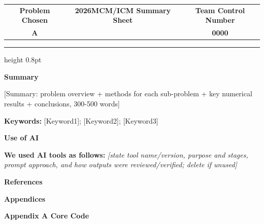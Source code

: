\documentclass[a4paper,12pt]{article}
\newcommand{\MCMYear}{2026}
\newcommand{\TeamNumber}{0000}
\newcommand{\ProblemChosen}{A}
\newcommand{\SummaryText}{[Summary: problem overview + methods for each sub-problem + key numerical results + conclusions, 300-500 words]}
\newcommand{\KeywordsText}{[Keyword1]; [Keyword2]; [Keyword3]}
\begin{document}
\thispagestyle{empty}
\vspace*{-1.8em}
\begin{center}
  \begin{tabular}{ccc}
    \textbf{Problem Chosen} & \textbf{\MCMYear MCM/ICM Summary Sheet} & \textbf{Team Control Number} \\[0.7em]
    \textbf{\LARGE\ProblemChosen} & & \textbf{\LARGE\TeamNumber}
  \end{tabular}
\end{center}
\vspace{0.43em}
\hrule height 0.8pt
\vspace{2.4em}
\begin{center}\textbf{Summary}\end{center}
\vspace{2.1em}
\SummaryText
\vspace{0.75em}
\par\textbf{Keywords:} \KeywordsText
\newpage

\pagestyle{fancy}

\pagebreak[100]

\pagebreak[100]

\pagebreak[100]



\pagebreak[100]


\pagebreak[100]
\fontsize{20pt}{24pt}\selectfont\textbf{Use of AI}\par\normalsize
\textbf{We used AI tools as follows:} \textit{[state tool name/version, purpose and stages, prompt approach, and how outputs were reviewed/verified; delete if unused]}%
\par\vspace{1em}
\fontsize{20pt}{24pt}\selectfont\textbf{References}\par\normalsize


\pagebreak[100]
\fontsize{28pt}{32pt}\selectfont\textbf{Appendices}\par
\fontsize{20pt}{24pt}\selectfont\textbf{Appendix A \quad Core Code}\par\normalsize

\end{document}
